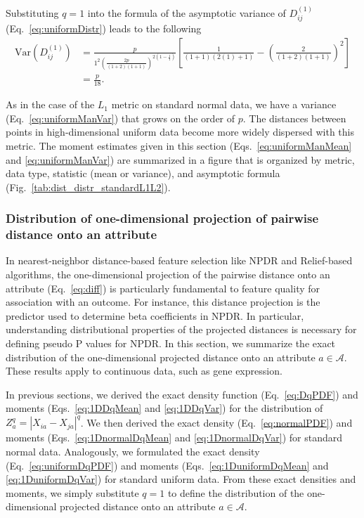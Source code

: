 \documentclass[10pt,letterpaper]{article}
\begin{document}
Substituting $q=1$ into the formula of the asymptotic variance of $D^{(1)}_{ij}$ (Eq.~\ref{eq:uniformDistr}) leads to the following
%
\begin{equation}\label{eq:uniformManVar}
\begin{aligned}
\text{Var}\left(D^{(1)}_{ij}\right) &= \frac{p}{1^2\left(\frac{2p}{(1 + 2)(1 + 1)}\right)^{2\left(1 - \frac{1}{1}\right)}}\left[\frac{1}{(1 + 1)(2(1) + 1)} - \left(\frac{2}{(1 + 2)(1 + 1)}\right)^2\right] \\
&= \frac{p}{18}.
\end{aligned}
\end{equation}

As in the case of the $L_1$ metric on standard normal data, we have a variance (Eq.~\ref{eq:uniformManVar}) that grows on the order of $p$. The distances between points in high-dimensional uniform data become more widely dispersed with this metric. The moment estimates given in this section (Eqs.~\ref{eq:uniformManMean} and \ref{eq:uniformManVar}) are summarized in a figure that is organized by metric, data type, statistic (mean or variance), and asymptotic formula (Fig.~\ref{tab:dist_distr_standardL1L2}).

\subsubsection{Distribution of one-dimensional projection of pairwise distance onto an attribute}\label{sec:continuous_diff}

In nearest-neighbor distance-based feature selection like NPDR and Relief-based algorithms, the one-dimensional projection of the pairwise distance onto an attribute (Eq.~\ref{eq:diff}) is particularly fundamental to feature quality for association with an outcome. For instance, this distance projection is the predictor used to determine beta coefficients in NPDR. In particular, understanding distributional properties of the projected distances is necessary for defining pseudo P values for NPDR. In this section, we summarize the exact distribution of the one-dimensional projected distance onto an attribute $a \in \mathcal{A}$. These results apply to continuous data, such as gene expression. 

In previous sections, we derived the exact density function (Eq.~\ref{eq:DqPDF}) and moments (Eqs.~\ref{eq:1DDqMean} and \ref{eq:1DDqVar}) for the distribution of $Z^q_a=|X_{ia}-X_{ja}|^q$. We then derived the exact density (Eq.~\ref{eq:normalPDF}) and moments (Eqs.~\ref{eq:1DnormalDqMean} and \ref{eq:1DnormalDqVar}) for standard normal data. Analogously, we formulated the exact density (Eq.~\ref{eq:uniformDqPDF}) and moments (Eqs.~\ref{eq:1DuniformDqMean} and \ref{eq:1DuniformDqVar}) for standard uniform data. From these exact densities and moments, we simply substitute $q=1$ to define the distribution of the one-dimensional projected distance onto an attribute $a \in \mathcal{A}$.
\end{document}
